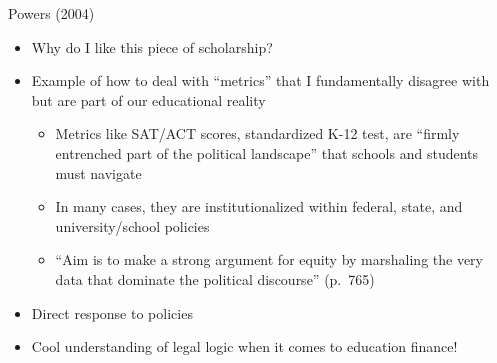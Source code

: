 \documentclass[
  8pt,
  ignorenonframetext,
  dvipsnames]{beamer}
\providecommand{\tightlist}{%
  \setlength{\itemsep}{0pt}\setlength{\parskip}{0pt}}
\let\olditem\item
\renewcommand{\item}{%
  \olditem\vspace{4pt}
}
\begin{document}
\begin{frame}{Powers (2004)}
\protect\hypertarget{powers-2004-3}{}

\begin{itemize}
\tightlist
\item
  Why do I like this piece of scholarship?
\item
  Example of how to deal with ``metrics'' that I fundamentally disagree
  with but are part of our educational reality

  \begin{itemize}
  \tightlist
  \item
    Metrics like SAT/ACT scores, standardized K-12 test, are ``firmly
    entrenched part of the political landscape'' that schools and
    students must navigate
  \item
    In many cases, they are institutionalized within federal, state, and
    university/school policies
  \item
    ``Aim is to make a strong argument for equity by marshaling the very
    data that dominate the political discourse'' (p.~765)
  \end{itemize}
\item
  Direct response to policies
\item
  Cool understanding of legal logic when it comes to education finance!
\end{itemize}

\end{frame}
\end{document}
